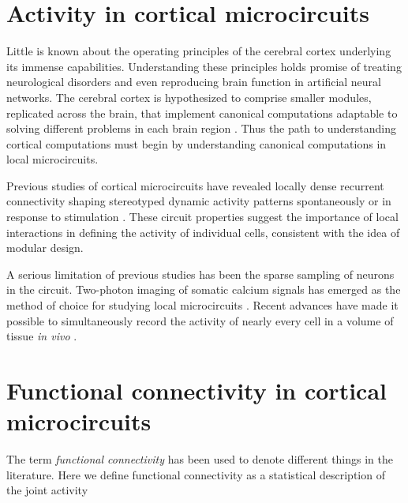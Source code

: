 \section{Activity in cortical microcircuits}
Little is known about the operating principles of the cerebral cortex underlying its immense capabilities. 
Understanding these principles holds promise of treating neurological disorders and even reproducing brain function in artificial neural networks.
The cerebral cortex is hypothesized to comprise smaller modules, replicated across the brain, that implement canonical computations adaptable to solving different problems in each brain region \citep{Mountcastle:1997, Douglas:2007}. 
Thus the path to understanding cortical computations must begin by understanding canonical computations in local microcircuits.

Previous studies of cortical microcircuits have revealed locally dense recurrent connectivity \citep{Douglas:2007} shaping stereotyped dynamic activity patterns spontaneously or in response to stimulation \citep{MacLean:2005,Luczak:2009,Harris:2011,Miller:2014}. These circuit properties suggest the importance of local interactions in defining the activity of individual cells, consistent with the idea of modular design. 

A serious limitation of previous studies has been the sparse sampling of neurons in the circuit.  Two-photon imaging of somatic calcium signals has emerged as the method of choice for studying local microcircuits \citep{Stosiek:2003,Ko:2011,Ko:2013,Hofer:2011}.  Recent advances have made it possible to simultaneously record the activity of nearly every cell in a volume of tissue \emph{in vivo} \citep{Reddy:2005, Katona:2012, Cotton:2013}. 

\section{Functional connectivity in cortical microcircuits}
The term \emph{functional connectivity} has been used to denote different things in the literature. Here we define functional connectivity as a statistical description of the joint activity 


